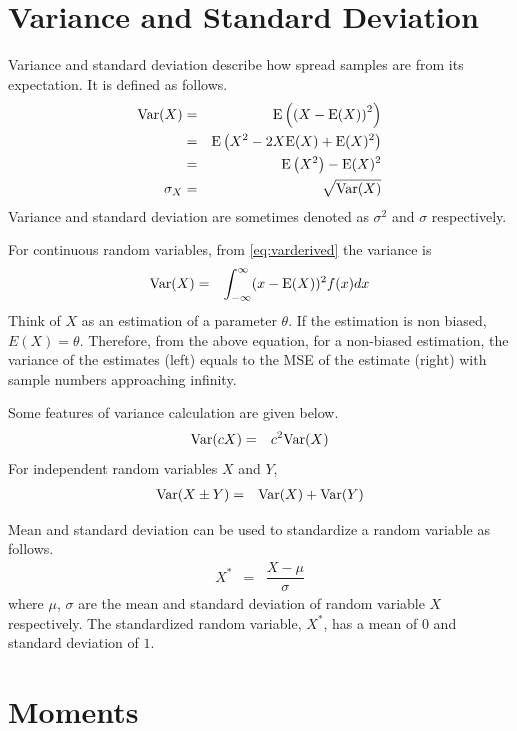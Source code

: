 \section{Variance and Standard Deviation}

Variance and standard deviation describe how spread samples are from its expectation. It is defined as follows.
\begin{eqnarray}
  \textup{Var}(X) &=& \textup{E}\left(\left(X-\textup{E}(X)\right)^2\right) \label{eq:vardef} \\
  &=& \textup{E}\left(X^2-2X\textup{E}(X)+\textup{E}(X)^2\right) \nonumber \\
  &=& \textup{E}\left(X^2\right)-\textup{E}(X)^2 \label{eq:varderived} \\
  \sigma_X &=& \sqrt{\textup{Var}(X)} \nonumber
\end{eqnarray}
Variance and standard deviation are sometimes denoted as $\sigma^2$ and $\sigma$ respectively.

For continuous random variables, from \eqref{eq:varderived} the variance is
\begin{eqnarray}
  \textup{Var}(X) &=& \int_{-\infty}^{\infty} (x-\textup{E}(X))^2f(x)dx \nonumber
\end{eqnarray}
Think of $X$ as an estimation of a parameter $\theta$. If the estimation is non biased, $E(X)=\theta$. Therefore, from the above equation, for a non-biased estimation, the variance of the estimates (left) equals to the MSE of the estimate (right) with sample numbers approaching infinity.

Some features of variance calculation are given below.
\begin{eqnarray}
  \textup{Var}(cX) &=& c^2\textup{Var}(X) \nonumber
\end{eqnarray}
For independent random variables $X$ and $Y$,
\begin{eqnarray}
  \textup{Var}(X\pm Y) &=& \textup{Var}(X) + \textup{Var}(Y) \nonumber
\end{eqnarray}

Mean and standard deviation can be used to standardize a random variable as follows.
\begin{eqnarray}
  X^* &=& \dfrac{X-\mu}{\sigma} \nonumber
\end{eqnarray}
where $\mu$, $\sigma$ are the mean and standard deviation of random variable $X$ respectively. The standardized random variable, $X^*$, has a mean of $0$ and standard deviation of $1$.

\section{Moments}

